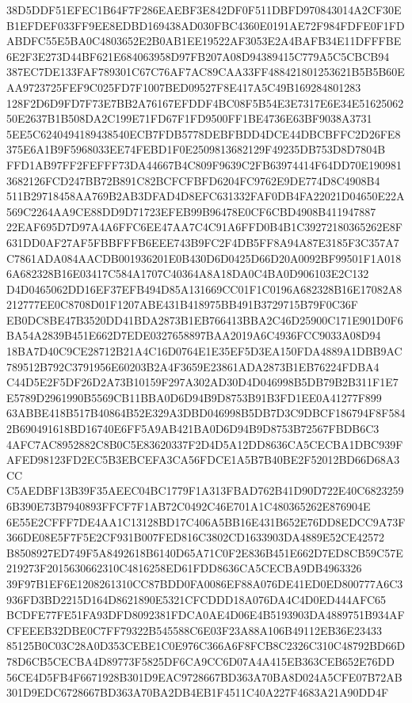 \documentclass[UTF8,fontset=fandol,zihao=-4,a4paper]{ctexart}
\begin{document}
{{38D5DDF51EFEC1B64F7F286EAEBF3E842DF0F511DBFD970843014A2CF30EB1EFDEF033FF9EE8EDBD169438AD030FBC4360E0191AE72F984FDFE0F1FD
ABDFC55E5BA0C4803652E2B0AB1EE19522AF3053E2A4BAFB34E11DFFFBE6E2F3E273D44BF621E684063958D97FB207A08D94389415C779A5C5CBCB94
387EC7DE133FAF789301C67C76AF7AC89CAA33FF488421801253621B5B5B60EAA9723725FEF9C025FD7F1007BED09527F8E417A5C49B169284801283
128F2D6D9FD7F73E7BB2A76167EFDDF4BC08F5B54E3E7317E6E34E5162506250E2637B1B508DA2C199E71FD67F1FD9500FF1BE4736E63BF9038A3731
5EE5C6240494189438540ECB7FDB5778DEBFBDD4DCE44DBCBFFC2D26FE8375E6A1B9F5968033EE74FEBD1F0E2509813682129F49235DB753D8D7804B
FFD1AB97FF2FEFFF73DA44667B4C809F9639C2FB63974414F64DD70E1909813682126FCD247BB72B891C82BCFCFBFD6204FC9762E9DE774D8C4908B4
511B29718458AA769B2AB3DFAD4D8EFC631332FAF0DB4FA22021D04650E22A569C2264AA9CE88DD9D71723EFEB99B96478E0CF6CBD4908B411947887
22EAF695D7D97A4A6FFC6EE47AA7C4C91A6FFD0B4B1C39272180365262E8F631DD0AF27AF5FBBFFFB6EEE743B9FC2F4DB5FF8A94A87E3185F3C357A7
C7861ADA084AACDB001936201E0B430D6D0425D66D20A0092BF99501F1A0186A682328B16E03417C584A1707C40364A8A18DA0C4BA0D906103E2C132
D4D0465062DD16EF37EFB494D85A131669CC01F1C0196A682328B16E17082A8212777EE0C8708D01F1207ABE431B418975BB491B3729715B79F0C36F
EB0DC8BE47B3520DD41BDA2873B1EB766413BBA2C46D25900C171E901D0F6BA54A2839B451E662D7EDE0327658897BAA2019A6C4936FCC9033A08D94
18BA7D40C9CE28712B21A4C16D0764E1E35EF5D3EA150FDA4889A1DBB9AC789512B792C3791956E60203B2A4F3659E23861ADA2873B1EB76224FDBA4
C44D5E2F5DF26D2A73B10159F297A302AD30D4D046998B5DB79B2B311F1E7E5789D2961990B5569CB11BBA0D6D94B9D8753B91B3FD1EE0A41277F899
63ABBE418B517B40864B52E329A3DBD046998B5DB7D3C9DBCF186794F8F5842B690491618BD16740E6FF5A9AB421BA0D6D94B9D8753B72567FBDB6C3
4AFC7AC8952882C8B0C5E83620337F2D4D5A12DD8636CA5CECBA1DBC939FAFED98123FD2EC5B3EBCEFA3CA56FDCE1A5B7B40BE2F52012BD66D68A3CC
C5AEDBF13B39F35AEEC04BC1779F1A313FBAD762B41D90D722E40C68232596B390E73B7940893FFCF7F1AB72C0492C46E701A1C480365262E876904E
6E55E2CFFF7DE4AA1C13128BD17C406A5BB16E431B652E76DD8EDCC9A73F366DE08E5F7F5E2CF931B007FED816C3802CD1633903DA4889E52CE42572
B8508927ED749F5A8492618B6140D65A71C0F2E836B451E662D7ED8CB59C57E219273F2015630662310C4816258ED61FDD8636CA5CECBA9DB4963326
39F97B1EF6E1208261310CC87BDD0FA0086EF88A076DE41ED0ED800777A6C3936FD3BD2215D164D8621890E5321CFCDDD18A076DA4C4D0ED444AFC65
BCDFE77FE51FA93DFD8092381FDCA0AE4D06E4B5193903DA4889751B934AFCFEEEB32DBE0C7FF79322B545588C6E03F23A88A106B49112EB36E23433
85125B0C03C28A0D353CEBE1C0E976C366A6F8FCB8C2326C310C48792BD66D78D6CB5CECBA4D89773F5825DF6CA9CC6D07A4A415EB363CEB652E76DD
56CE4D5FB4F6671928B301D9EAC9728667BD363A70BA8D024A5CFE07B72AB301D9EDC6728667BD363A70BA2DB4EB1F4511C40A227F4683A21A90DD4F
}}
\end{document}
